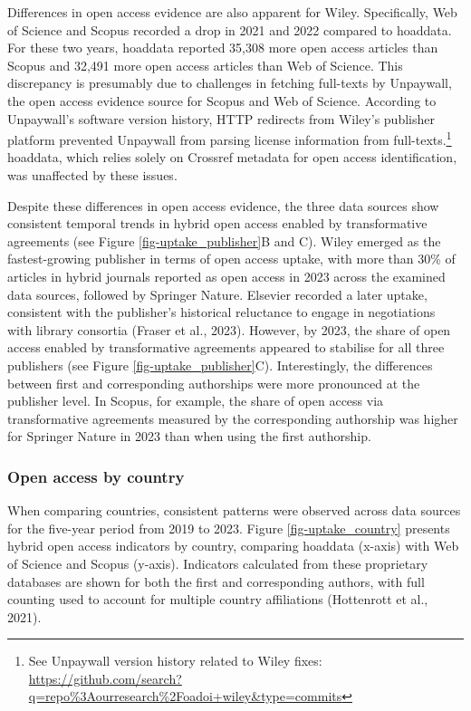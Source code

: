 \documentclass[a4paper,man,floatsintext,longtable,noextraspace,10pt]{apa6}
\begin{document}
Differences in open access evidence are also apparent for Wiley.
Specifically, Web of Science and Scopus recorded a drop in 2021 and 2022
compared to hoaddata. For these two years, hoaddata reported 35,308 more
open access articles than Scopus and 32,491 more open access articles
than Web of Science. This discrepancy is presumably due to challenges in
fetching full-texts by Unpaywall, the open access evidence source for
Scopus and Web of Science. According to Unpaywall's software version
history, HTTP redirects from Wiley's publisher platform prevented
Unpaywall from parsing license information from full-texts.\footnote{See
  Unpaywall version history related to Wiley fixes:
  \url{https://github.com/search?q=repo\%3Aourresearch\%2Foadoi+wiley&type=commits}}
hoaddata, which relies solely on Crossref metadata for open access
identification, was unaffected by these issues.

Despite these differences in open access evidence, the three data
sources show consistent temporal trends in hybrid open access enabled by
transformative agreements (see Figure \ref{fig-uptake_publisher}B and
C). Wiley emerged as the fastest-growing publisher in terms of open
access uptake, with more than 30\% of articles in hybrid journals
reported as open access in 2023 across the examined data sources,
followed by Springer Nature. Elsevier recorded a later uptake,
consistent with the publisher's historical reluctance to engage in
negotiations with library consortia (Fraser et al., 2023). However, by
2023, the share of open access enabled by transformative agreements
appeared to stabilise for all three publishers (see Figure
\ref{fig-uptake_publisher}C). Interestingly, the differences between
first and corresponding authorships were more pronounced at the
publisher level. In Scopus, for example, the share of open access via
transformative agreements measured by the corresponding authorship was
higher for Springer Nature in 2023 than when using the first authorship.

\subsubsection{Open access by country}\label{open-access-by-country}

When comparing countries, consistent patterns were observed across data
sources for the five-year period from 2019 to 2023. Figure
\ref{fig-uptake_country} presents hybrid open access indicators by
country, comparing hoaddata (x-axis) with Web of Science and Scopus
(y-axis). Indicators calculated from these proprietary databases are
shown for both the first and corresponding authors, with full counting
used to account for multiple country affiliations (Hottenrott et al.,
2021).
\end{document}
